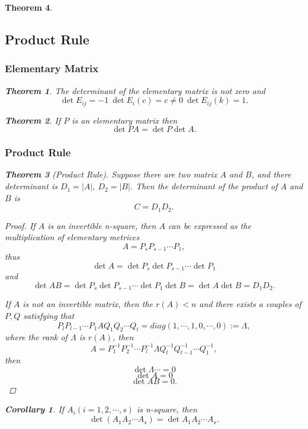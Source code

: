 \documentclass{article}
\newtheorem{theorem}{Theorem}[section]
\newtheorem{corollary}{Corollary}[theorem]
\theoremstyle{definition}
\begin{document}
\begin{theorem}
\subsection{Product Rule}

\subsubsection{Elementary Matrix}

\begin{theorem}
    The determinant of the elementary matrix is not zero and 
    $$\det E_{ij}=-1\ \det E_{i}(c)=c\neq 0\ \det E_{ij}(k)=1.$$
\end{theorem}

\begin{theorem}
    If $P$ is an elementary matrix then 
    $$\det PA = \det P\det A.$$
\end{theorem}

\subsubsection{Product Rule}
\begin{theorem}[Product Rule]
    Suppose there are two matrix $A$ and $B$,
    and there determinant is $D_{1}=|A|,\ D_{2}=|B|$.
    Then the determinant of the product of $A$ and $B$ is
    $$C=D_{1}D_{2}.$$
\end{theorem}

\begin{proof}
    If $A$ is an invertible n-square, then $A$ can be expressed as the multiplication 
    of elementary metrices
    $$A=P_{s}P_{s-1}\cdots P_{1},$$
    thus $$\det A =\det P_{s}\det P_{s-1}\cdots \det P_{1}$$
    and $$\det AB = \det P_{s}\det P_{s-1}\cdots \det P_{1} \det B=\det A \det B= D_{1}D_{2}.$$

    If $A$ is not an invertible matrix, then the $r(A)<n$ and there exists a couples of $P,Q$ satisfying that 
    $$P_{l}P_{l-1}\cdots P_{1}AQ_{1}Q_{2}\cdots Q_{t}=diag(1,\cdots,1,0,\cdots,0):= \Lambda ,$$
    where the rank of $\Lambda$ is $r(A)$, then 
    $$A = P^{-1}_{1}P^{-1}_{2}\cdots P^{-1}_{l}\Lambda Q^{-1}_{t}Q^{-1}_{t-1}\cdots Q^{-1}_{1},$$
    then $$\det \Lambda\cdots =0$$
    $$\det A = 0$$
    $$\det AB = 0.$$
\end{proof}

\begin{corollary}
    If $A_{i}(i=1,2,\cdots,s)$ is n-square, then 
    $$\det (A_{1}A_{2}\cdots A_{s})=\det A_{1}A_{2}\cdots A_{s}.$$
\end{corollary}



\end{theorem}
\end{document}
